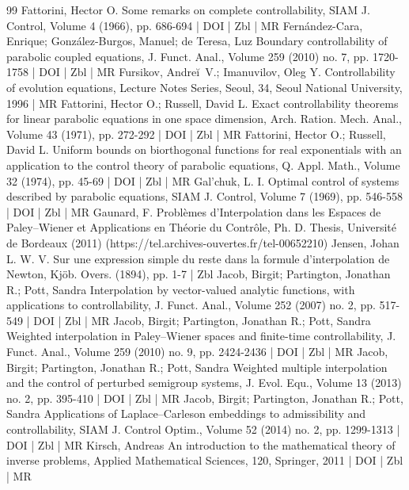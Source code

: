 \documentclass[10pt]{amsart}
\theoremstyle{definition}\newtheorem{defi}[theo]{Definition}\newtheorem{rema}[theo]{Remark}\newtheorem{exam}[theo]{Example}\newtheorem{exem}[theo]{Example}\newtheorem{nota}[theo]{Notation}
\begin{document}
\begin{thebibliography}{99}
Fattorini, Hector O. Some remarks on complete controllability, SIAM J. Control, Volume 4 (1966), pp. 686-694 | DOI | Zbl | MR
Fernández-Cara, Enrique; González-Burgos, Manuel; de Teresa, Luz Boundary controllability of parabolic coupled equations, J. Funct. Anal., Volume 259 (2010) no. 7, pp. 1720-1758 | DOI | Zbl | MR
Fursikov, Andreĭ V.; Imanuvilov, Oleg Y. Controllability of evolution equations, Lecture Notes Series, Seoul, 34, Seoul National University, 1996 | MR
Fattorini, Hector O.; Russell, David L. Exact controllability theorems for linear parabolic equations in one space dimension, Arch. Ration. Mech. Anal., Volume 43 (1971), pp. 272-292 | DOI | Zbl | MR
Fattorini, Hector O.; Russell, David L. Uniform bounds on biorthogonal functions for real exponentials with an application to the control theory of parabolic equations, Q. Appl. Math., Volume 32 (1974), pp. 45-69 | DOI | Zbl | MR
Gal’chuk, L. I. Optimal control of systems described by parabolic equations, SIAM J. Control, Volume 7 (1969), pp. 546-558 | DOI | Zbl | MR
Gaunard, F. Problèmes d’Interpolation dans les Espaces de Paley–Wiener et Applications en Théorie du Contrôle, Ph. D. Thesis, Université de Bordeaux (2011) (https://tel.archives-ouvertes.fr/tel-00652210)
Jensen, Johan L. W. V. Sur une expression simple du reste dans la formule d’interpolation de Newton, Kjöb. Overs. (1894), pp. 1-7 | Zbl
Jacob, Birgit; Partington, Jonathan R.; Pott, Sandra Interpolation by vector-valued analytic functions, with applications to controllability, J. Funct. Anal., Volume 252 (2007) no. 2, pp. 517-549 | DOI | Zbl | MR
Jacob, Birgit; Partington, Jonathan R.; Pott, Sandra Weighted interpolation in Paley–Wiener spaces and finite-time controllability, J. Funct. Anal., Volume 259 (2010) no. 9, pp. 2424-2436 | DOI | Zbl | MR
Jacob, Birgit; Partington, Jonathan R.; Pott, Sandra Weighted multiple interpolation and the control of perturbed semigroup systems, J. Evol. Equ., Volume 13 (2013) no. 2, pp. 395-410 | DOI | Zbl | MR
Jacob, Birgit; Partington, Jonathan R.; Pott, Sandra Applications of Laplace–Carleson embeddings to admissibility and controllability, SIAM J. Control Optim., Volume 52 (2014) no. 2, pp. 1299-1313 | DOI | Zbl | MR
Kirsch, Andreas An introduction to the mathematical theory of inverse problems, Applied Mathematical Sciences, 120, Springer, 2011 | DOI | Zbl | MR

\end{thebibliography}
\end{document}
